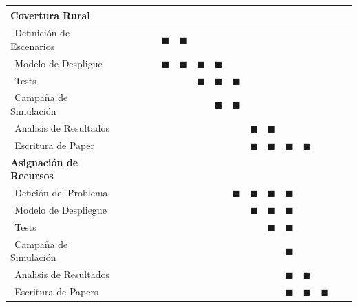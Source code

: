 \documentclass[12pt,a4paper]{article}
\begin{document}
\begin{table}[H]
\begin{center}
\begin{tabular}{|p{4.0cm}|c|c|c|c|c|c|c|c|c|c|c|c|c|c|c|c|}
\textbf{Covertura Rural}      &  &  &  &  &      &  &  &  &      &  &  &  &      &  &  &  \\ \hline
$~~$Definición de Escenarios  &  &  &  &  &     $\blacksquare$ & $\blacksquare$ &  &  &      &  &  &  &      &  &  &  \\ \hline
$~~$Modelo de Despligue        &  &  &  &  &     $\blacksquare$ & $\blacksquare$ & $\blacksquare$ & $\blacksquare$ &      &  &  &  &      &  &  &  \\ \hline
$~~$Tests                    &  &  &  &  &      &  & $\blacksquare$ & $\blacksquare$ &     $\blacksquare$ &  &  &  &      &  &  &  \\ \hline
$~~$Campaña de Simulación     &  &  &  &  &      &  &  & $\blacksquare$ &     $\blacksquare$ &  &  &  &      &  &  &  \\ \hline
$~~$Analisis de Resultados      &  &  &  &  &      &  &  &  &      & $\blacksquare$ & $\blacksquare$ &  &      &  &  &  \\ \hline
$~~$Escritura de Paper        &  &  &  &  &      &  &  &  &      & $\blacksquare$ & $\blacksquare$ & $\blacksquare$ &     $\blacksquare$ &  &  &  \\ \hline \hline

\textbf{Asignación de Recursos} &  &  &  &  &      &  &  &  &      &  &  &  &      &  &  &  \\ \hline
$~~$Defición del Problema       &  &  &  &  &      &  &  &  &     $\blacksquare$ & $\blacksquare$ & $\blacksquare$ & $\blacksquare$ &      &  &  &  \\ \hline
$~~$Modelo de Despliegue        &  &  &  &  &      &  &  &  &      & $\blacksquare$ & $\blacksquare$ & $\blacksquare$ &      &  &  &  \\ \hline
$~~$Tests                    &  &  &  &  &      &  &  &  &      &  & $\blacksquare$ & $\blacksquare$ &      &  &  &  \\ \hline
$~~$Campaña de Simulación     &  &  &  &  &      &  &  &  &      &  &  & $\blacksquare$ &      &  &  &  \\ \hline
$~~$Analisis de Resultados      &  &  &  &  &      &  &  &  &      &  &  & $\blacksquare$ &     $\blacksquare$ &  &  &  \\ \hline
$~~$Escritura de Papers        &  &  &  &  &      &  &  &  &      &  &  & $\blacksquare$ &     $\blacksquare$ & $\blacksquare$ &  &  \\ \hline 
\end{tabular}
\end{center}
\end{table}
\end{document}
